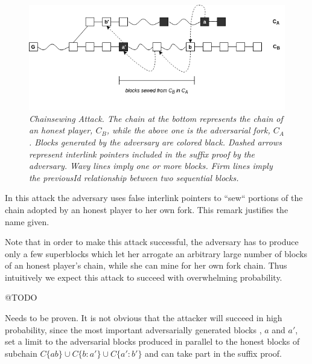 \begin{figure}[h!]
	\begin{center}
		\includegraphics[scale=0.55]{figures/chainsewing_attack.png}
	\end{center}
	\caption{\textit{Chainsewing Attack. The chain at the bottom represents the chain
	of an honest player, $C_B$, while the above one is the adversarial fork, $C_A$.
	Blocks generated by the adversary are colored black. Dashed arrows represent
	interlink pointers included in the suffix proof by the adversary. Wavy lines
	imply one or more blocks. Firm lines imply the previousId relationship between
	two sequential blocks.}}
	\label{fig:attack}
\end{figure}

In this attack the adversary uses false interlink pointers to ``sew`` portions of
the chain adopted by an honest player to her own fork. This remark justifies the
name given.

Note that in order to make this attack successful, the adversary has to produce
only a few superblocks which let her arrogate an arbitrary large number of blocks
of an honest player's chain, while she can mine for her own fork chain. Thus
intuitively we expect this attack to succeed with overwhelming probability.

@TODO

Needs to be proven. It is not obvious that the attacker will succeed in high
probability, since the most important adversarially generated blocks , $a$
and $a'$, set a limit to the adversarial blocks produced in parallel to the
honest blocks of subchain $C\{ab\} \cup C\{b:a'\} \cup C\{a':b'\}$ and can
take part in the suffix proof.
